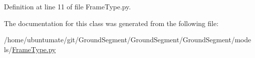 Definition at line 11 of file Frame\+Type.\+py.



The documentation for this class was generated from the following file\+:\begin{DoxyCompactItemize}
\item 
/home/ubuntumate/git/\+Ground\+Segment/\+Ground\+Segment/\+Ground\+Segment/models/\hyperlink{_frame_type_8py}{Frame\+Type.\+py}\end{DoxyCompactItemize}
